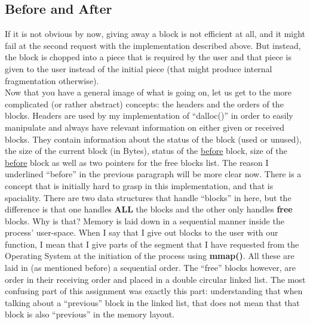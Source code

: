 \documentclass[a4paper,10pt]{article}
\begin{document}
\subsection*{Before and After}
If it is not obvious by now, giving away a block is not efficient at all, and it might fail at the second request with the implementation described above. But instead, the block is chopped into a piece that is required by the user and that piece is given to the user instead of the initial piece (that might produce internal fragmentation otherwise).\\
\vspace{5mm}
Now that you have a general image of what is going on, let us get to the more complicated (or rather abstract) concepts: the headers and the orders of the blocks. Headers are used by my implementation of ``dalloc()'' in order to easily manipulate and always have relevant information on either given or received blocks. They contain information about the status of the block (used or unused), the size of the current block (in Bytes), status of the \underline{before} block, size of the \underline{before} block as well as two pointers for the free blocks list.
\vspace{5mm}
The reason I underlined ``before'' in the previous paragraph will be more clear now. There is a concept that is initially hard to grasp in this implementation, and that is spaciality. There are two data structures that handle ``blocks'' in here, but the difference is that one handles \textbf{ALL} the blocks and the other only handles \textbf{free} blocks. Why is that?
\vspace{5mm}
Memory is laid down in a sequential manner inside the process' user-space. When I say that I give out blocks to the user with our function, I mean that I give parts of the segment that I have requested from the Operating System at the initiation of the process using \textbf{mmap()}. All these are laid in (as mentioned before) a sequential order. The ``free'' blocks however, are order in their receiving order and placed in a double circular linked list. The most confusing part of this assignment was exactly this part: understanding that when talking about a ``previous'' block in the linked list, that does not mean that that block is also ``previous'' in the memory layout.
\end{document}
